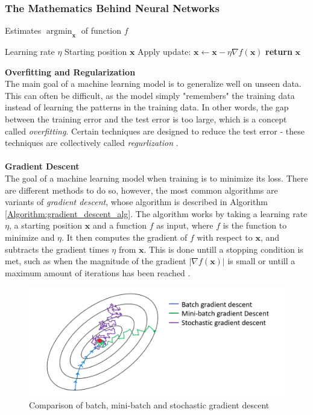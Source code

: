 \documentclass[main.tex]{subfiles}
\begin{document}
\subsubsection{The Mathematics Behind Neural Networks}
\begin{algorithm}[h]
    \caption{Estimates $\operatorname*{argmin}_{\bm{x}}$ of function $f$ \cite{d2l}}
    \label{Algorithm:gradient_descent_alg}
    \begin{algorithmic}[1]
        \Require Learning rate $\eta$
        \Require Starting position $\bm{x}$
            \State Apply update: $\bm{x} \gets  \bm{x} - \eta \nabla f(\bm{x})$
        \EndWhile
        \State \textbf{return} $\bm{x}$
        \EndProcedure
    \end{algorithmic}
\end{algorithm}
\noindent \textbf{Overfitting and Regularization} \\
The main goal of a machine learning model is to generalize well on unseen data. This can often be difficult, as the model simply "remembers" the training data instead of learning the patterns in the training data. In other words, the gap between the training error and the test error is too large, which is a concept called \textit{overfitting}. Certain techniques are designed to reduce the test error - these techniques are collectively called \textit{regurlization} \cite{DeepLearning}. 
\\
\\
\textbf{Gradient Descent} \\
The goal of a machine learning model when training is to minimize its loss. There are different methods to do so, however, the most common algorithms are variants of \textit{gradient descent}, whose algorithm is described in Algorithm \ref{Algorithm:gradient_descent_alg}. The algorithm works by taking a learning rate $\eta$, a starting position $\bm{x}$ and a function $f$ as input, where $f$ is the function to minimize and $\eta$. It then computes the gradient of $f$ with respect to $\bm{x}$, and subtracts the gradient times $\eta$ from $\bm{x}$. This is done untill a stopping condition is met, such as when the magnitude of the gradient $\left| \nabla f(\bm{x}) \right|$ is small or untill a maximum amount of iterations has been reached \cite{d2l}.
\begin{figure}
    \centering
    \includegraphics[width = 8 cm]{entities/batch_methods.PNG}
    \caption{Comparison of batch, mini-batch and stochastic gradient descent \cite{EML_optimization}}
    \label{fig:batch_methods}
\end{figure}
\end{document}
